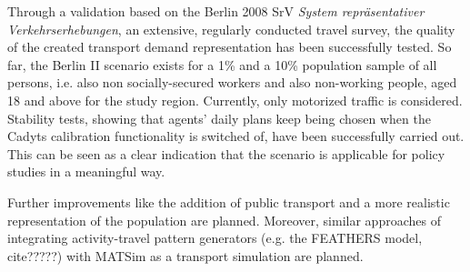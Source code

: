 Through a validation based on the Berlin 2008 SrV \textit{System repräsentativer Verkehrserhebungen}, an extensive, regularly conducted travel survey, the quality of the created transport demand representation has been successfully tested. So far, the Berlin II scenario exists for a 1\%{} and a 10\%{} population sample of all persons, i.e. also non socially-secured workers and also non-working people, aged 18 and above for the study region. Currently, only motorized traffic is considered. Stability tests, showing that agents' daily plans keep being chosen when the Cadyts calibration functionality is switched of, have been successfully carried out. This can be seen as a clear indication that the scenario is applicable for policy studies in a meaningful way.

Further improvements like the addition of public transport and a more realistic representation of the population are planned. Moreover, similar approaches of integrating activity-travel pattern generators (e.g. the FEATHERS model, cite?????) with MATSim as a transport simulation are planned.


